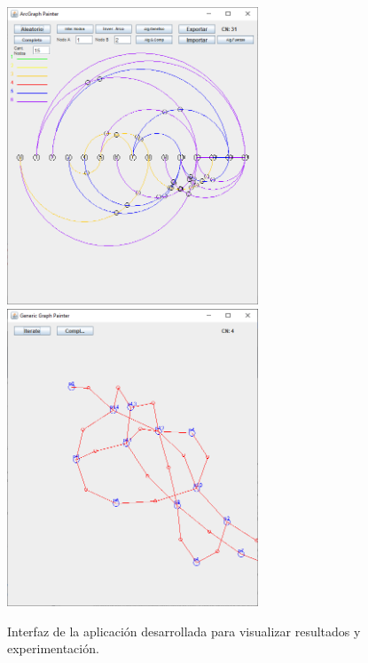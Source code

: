 	\begin{figure}
		\centering
		\includegraphics[width=7.5cm]{imagenes/aplicacion.png}
		\includegraphics[width=7.5cm]{imagenes/aplicacion_fuerzas.png}
		\caption{Interfaz de la aplicación desarrollada para visualizar resultados y experimentación.}
		\label{fig:aplicacion}
	\end{figure}
	
	
